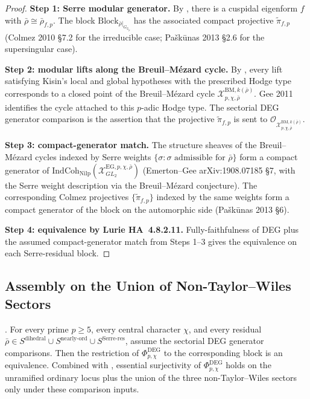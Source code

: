 \begin{proof}
\textbf{Step 1: Serre modular generator.} By
, there is a cuspidal eigenform
\(f\) with \(\bar\rho\cong\bar\rho_{f,p}\). The block
\(\mathrm{Block}_{\bar\rho|_{G_{\mathbb{Q}_{p}}}}\) has the associated
compact projective \(\widetilde{\pi}_{f,p}\) (Colmez 2010 \S 7.2 for
the irreducible case; Pa{\v s}k{\=u}nas 2013 \S 2.6 for the
supersingular case).

\textbf{Step 2: modular lifts along the Breuil--M{\'e}zard
cycle.} By , every lift satisfying
Kisin's local and global hypotheses with the prescribed Hodge type
corresponds to a closed point of the Breuil--M{\'e}zard cycle
\(\mathcal{X}^{\mathrm{BM},k(\bar\rho)}_{p,\chi,\bar\rho}\). Gee 2011
identifies the cycle attached to this \(p\)-adic Hodge type. The
sectorial DEG generator comparison is the assertion that the projective
\(\widetilde{\pi}_{f,p}\) is sent to
\(\mathcal{O}_{\mathcal{X}^{\mathrm{BM},k(\bar\rho)}_{p,\chi,\bar\rho}}\).

\textbf{Step 3: compact-generator match.} The structure sheaves of
the Breuil--M{\'e}zard cycles indexed by Serre weights
\(\{\sigma\colon\sigma\text{ admissible for }\bar\rho\}\) form a
compact generator of
\(\mathrm{IndCoh}_{\mathrm{Nilp}}(\mathcal{X}^{\mathrm{EG},p,\chi,\bar\rho}_{GL_{2}})\)
(Emerton--Gee arXiv:1908.07185 \S 7, with the Serre weight
description via the Breuil--M{\'e}zard conjecture). The corresponding
Colmez projectives \(\{\widetilde{\pi}_{f,p}\}\) indexed by the same
weights form a compact generator of the block on the automorphic
side (Pa{\v s}k{\=u}nas 2013 \S 6).

\textbf{Step 4: equivalence by Lurie HA~4.8.2.11.} Fully-faithfulness
of DEG plus the assumed compact-generator match from Steps 1--3 gives
the equivalence on each Serre-residual block.
\end{proof}

\subsection{Assembly on the Union of Non-Taylor--Wiles Sectors}

\begin{theorem}
\label{v4-arith:w6-e:thm:TW-removal-union}
\ClaimStatusNeedsVerification. For every prime \(p\geq 5\), every central
character \(\chi\), and every residual
\(\bar\rho\in S^{\mathrm{dihedral}}\cup S^{\mathrm{nearly\text{-}ord}}\cup
S^{\mathrm{Serre\text{-}res}}\), assume the sectorial DEG generator
comparisons. Then the restriction of
\(\Phi^{\mathrm{DEG}}_{p,\chi}\) to the corresponding block is an
equivalence. Combined with
, essential surjectivity of
\(\Phi^{\mathrm{DEG}}_{p,\chi}\) holds on the unramified ordinary
locus plus the union of the three non-Taylor--Wiles sectors only under
these comparison inputs.
\end{theorem}

